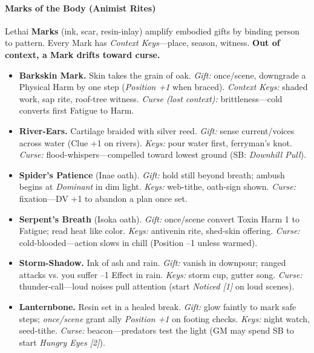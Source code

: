 \documentclass[11pt]{article}
\begin{document}
\paragraph{Marks of the Body (Animist Rites)}
Lethai \textbf{Marks} (ink, scar, resin-inlay) amplify embodied gifts by binding person to pattern. Every Mark has \emph{Context Keys}---place, season, witness. \textbf{Out of context, a Mark drifts toward curse.}
\begin{itemize}[leftmargin=*]
  \item \textbf{Barkskin Mark.} Skin takes the grain of oak. \emph{Gift:} once/scene, downgrade a Physical Harm by one step (\emph{Position +1} when braced). \emph{Context Keys:} shaded work, sap rite, roof-tree witness. \emph{Curse (lost context):} brittleness---cold converts first Fatigue to Harm.
  \item \textbf{River-Ears.} Cartilage braided with silver reed. \emph{Gift:} sense current/voices across water (Clue +1 on rivers). \emph{Keys:} pour water first, ferryman's knot. \emph{Curse:} flood-whispers---compelled toward lowest ground (SB: \emph{Downhill Pull}).
  \item \textbf{Spider's Patience} (Inae oath). \emph{Gift:} hold still beyond breath; ambush begins at \emph{Dominant} in dim light. \emph{Keys:} web-tithe, oath-sign shown. \emph{Curse:} fixation---DV +1 to abandon a plan once set.
  \item \textbf{Serpent's Breath} (Isoka oath). \emph{Gift:} once/scene convert Toxin Harm 1 to Fatigue; read heat like color. \emph{Keys:} antivenin rite, shed-skin offering. \emph{Curse:} cold-blooded---action slows in chill (Position --1 unless warmed).
  \item \textbf{Storm-Shadow.} Ink of ash and rain. \emph{Gift:} vanish in downpour; ranged attacks vs. you suffer --1 Effect in rain. \emph{Keys:} storm cup, gutter song. \emph{Curse:} thunder-call---loud noises pull attention (start \emph{Noticed [1]} on loud scenes).
  \item \textbf{Lanternbone.} Resin set in a healed break. \emph{Gift:} glow faintly to mark safe steps; \emph{once/scene} grant ally \emph{Position +1} on footing checks. \emph{Keys:} night watch, seed-tithe. \emph{Curse:} beacon---predators test the light (GM may spend SB to start \emph{Hungry Eyes [2]}).
\end{itemize}
\end{document}

